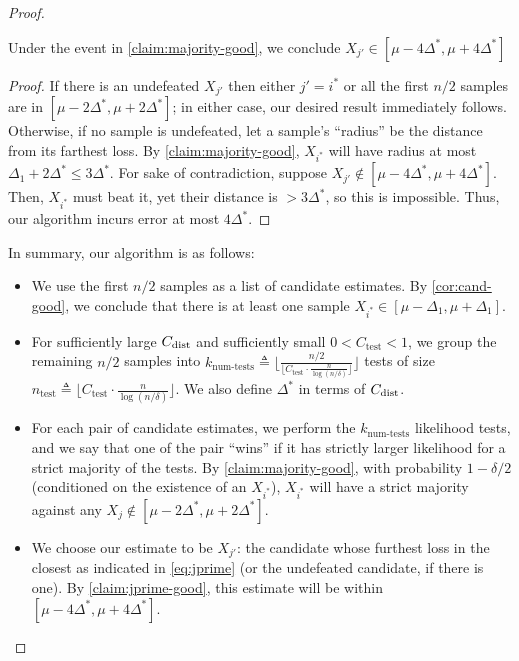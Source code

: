 \begin{proof}
\begin{claim}\label{claim:jprime-good}
    Under the event in \cref{claim:majority-good}, we conclude $X_{j'} \in [\mu - 4 \Delta^*, \mu + 4\Delta^*]$
\end{claim}
\begin{proof}

If there is an undefeated $X_{j'}$ then either $j' = i^*$ or all the first $n/2$ samples are in $[\mu-2\Delta^*,\mu+2\Delta^*]$; in either case, our desired result immediately follows. Otherwise, if no sample is undefeated, let a sample's ``radius'' be the distance from its farthest loss. By \cref{claim:majority-good}, $X_{i^*}$ will have radius at most $\Delta_1 + 2 \Delta^* \le 3 \Delta^*$. For sake of contradiction, suppose $X_{j'} \notin [\mu - 4\Delta^*, \mu + 4 \Delta^*]$. Then, $X_{i^*}$ must beat it, yet their distance is $> 3 \Delta^*$, so this is impossible. Thus, our algorithm incurs error at most $4 \Delta^*$. 
\end{proof}

In summary, our algorithm is as follows:
\begin{itemize}
    \item We use the first $n/2$ samples as a list of candidate estimates. By \cref{cor:cand-good}, we conclude that there is at least one sample $X_{i^*} \in [\mu - \Delta_1, \mu + \Delta_1]$.
    \item For sufficiently large $C_{\operatorname{dist}}$ and sufficiently small $0<C_{\textrm{test}}<1$, we group the remaining $n/2$ samples into $k_{\textrm{num-tests}} \triangleq \lfloor \frac{n/2}{\lfloor C_{\textrm{test}} \cdot \frac{n}{\log(n/\delta)} \rfloor} \rfloor$ tests of size $n_{\textrm{test}} \triangleq \lfloor C_{\textrm{test}} \cdot \frac{n}{\log(n/\delta)} \rfloor$. We also define $\Delta^*$ in terms of $C_{\operatorname{dist}}$.
    \item For each pair of candidate estimates, we perform the  $k_{\textrm{num-tests}}$ likelihood tests, and we say that one of the pair ``wins'' if it has strictly larger likelihood for a strict majority of the tests. By \cref{claim:majority-good}, with probability $1-\delta/2$ (conditioned on the existence of an $X_{i^*}$), $X_{i^*}$ will have a strict majority against any $X_j \notin [\mu - 2\Delta^*, \mu + 2\Delta^*]$. 
    \item We choose our estimate to be $X_{j'}$: the candidate whose furthest loss in the closest as indicated in \cref{eq:jprime} (or the undefeated candidate, if there is one). By \cref{claim:jprime-good}, this estimate will be within $[\mu - 4\Delta^*,\mu+ 4\Delta^*]$.
\end{itemize}
\end{proof}

